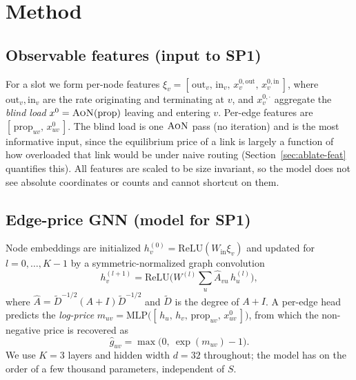 \documentclass[journal]{IEEEtran}
\newcommand{\prop}{\mathrm{prop}}
\newcommand{\AoN}{\textsc{AoN}}
\begin{document}
\section{Method}\label{sec:method}
\subsection{Observable features (input to SP1)}
For a slot we form per-node features
$\xi_v=[\,\mathrm{out}_v,\,\mathrm{in}_v,\,x^{0,\mathrm{out}}_v,\,x^{0,\mathrm{in}}_v\,]$,
where $\mathrm{out}_v,\mathrm{in}_v$ are the rate originating and terminating at $v$, and
$x^{0,\cdot}_v$ aggregate the \emph{blind load} $x^{0}=\AoN(\prop)$ leaving and entering
$v$. Per-edge features are $[\,\prop_{uv},\,x^{0}_{uv}\,]$. The blind load is one $\AoN$
pass (no iteration) and is the most informative input, since the equilibrium price of a
link is largely a function of how overloaded that link would be under naive routing
(Section~\ref{sec:ablate-feat} quantifies this). All features are scaled to be size
invariant, so the model does not see absolute coordinates or counts and cannot shortcut
on them.

\subsection{Edge-price GNN (model for SP1)}
Node embeddings are initialized $h_v^{(0)}=\mathrm{ReLU}(W_{\mathrm{in}}\xi_v)$ and
updated for $l=0,\dots,K-1$ by a symmetric-normalized graph convolution
\begin{equation}
h_v^{(l+1)}=\mathrm{ReLU}\!\Big(W^{(l)}\!\!\sum_{u}\hat A_{vu}\,h_u^{(l)}\Big),
\label{eq:gcn}
\end{equation}
where $\hat A=\tilde D^{-1/2}(A{+}I)\tilde D^{-1/2}$ and $\tilde D$ is the degree of
$A{+}I$. A per-edge head predicts the \emph{log-price}
$m_{uv}=\mathrm{MLP}\big([\,h_u,\,h_v,\,\prop_{uv},\,x^{0}_{uv}\,]\big)$, from which the
non-negative price is recovered as
\begin{equation}
\hat g_{uv}=\max\!\big(0,\ \exp(m_{uv})-1\big).
\label{eq:readout}
\end{equation}
We use $K=3$ layers and hidden width $d=32$ throughout; the model has on the order of a
few thousand parameters, independent of $S$.
\end{document}
